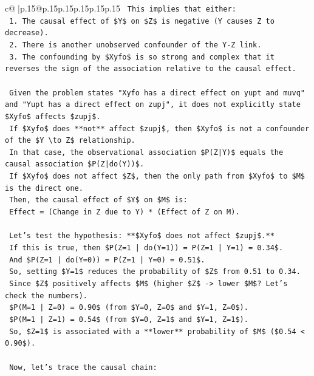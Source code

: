 \documentclass{article}
\begin{document}
{\begin{supertabular}{c@{$\;$}|p{.15\linewidth}@{}p{.15\linewidth}p{.15\linewidth}p{.15\linewidth}p{.15\linewidth}p{.15\linewidth}}
{{{\texttt{    This implies that either:} \\
\texttt{    1. The causal effect of \$Y\$ on \$Z\$ is negative (Y causes Z to decrease).} \\
\texttt{    2. There is another unobserved confounder of the Y{-}Z link.} \\
\texttt{    3. The confounding by \$Xyfo\$ is so strong and complex that it reverses the sign of the association relative to the causal effect.} \\
\\ 
\texttt{    Given the problem states "Xyfo has a direct effect on yupt and muvq" and "Yupt has a direct effect on zupj", it does not explicitly state \$Xyfo\$ affects \$zupj\$.} \\
\texttt{    If \$Xyfo\$ does **not** affect \$zupj\$, then \$Xyfo\$ is not a confounder of the \$Y \textbackslash{}to Z\$ relationship.} \\
\texttt{    In that case, the observational association \$P(Z|Y)\$ equals the causal association \$P(Z|do(Y))\$.} \\
\texttt{    If \$Xyfo\$ does not affect \$Z\$, then the only path from \$Xyfo\$ to \$M\$ is the direct one.} \\
\texttt{    Then, the causal effect of \$Y\$ on \$M\$ is:} \\
\texttt{    Effect = (Change in Z due to Y) * (Effect of Z on M).} \\
\\ 
\texttt{    Let's test the hypothesis: **\$Xyfo\$ does not affect \$zupj\$.**} \\
\texttt{    If this is true, then \$P(Z=1 | do(Y=1)) = P(Z=1 | Y=1) = 0.34\$.} \\
\texttt{    And \$P(Z=1 | do(Y=0)) = P(Z=1 | Y=0) = 0.51\$.} \\
\texttt{    So, setting \$Y=1\$ reduces the probability of \$Z\$ from 0.51 to 0.34.} \\
\texttt{    Since \$Z\$ positively affects \$M\$ (higher \$Z\$ {-}> lower \$M\$? Let's check the numbers).} \\
\texttt{    \$P(M=1 | Z=0) = 0.90\$ (from \$Y=0, Z=0\$ and \$Y=1, Z=0\$).} \\
\texttt{    \$P(M=1 | Z=1) = 0.54\$ (from \$Y=0, Z=1\$ and \$Y=1, Z=1\$).} \\
\texttt{    So, \$Z=1\$ is associated with a **lower** probability of \$M\$ (\$0.54 < 0.90\$).} \\
\\ 
\texttt{    Now, let's trace the causal chain:} \\
}}}
\end{supertabular}}
\end{document}
